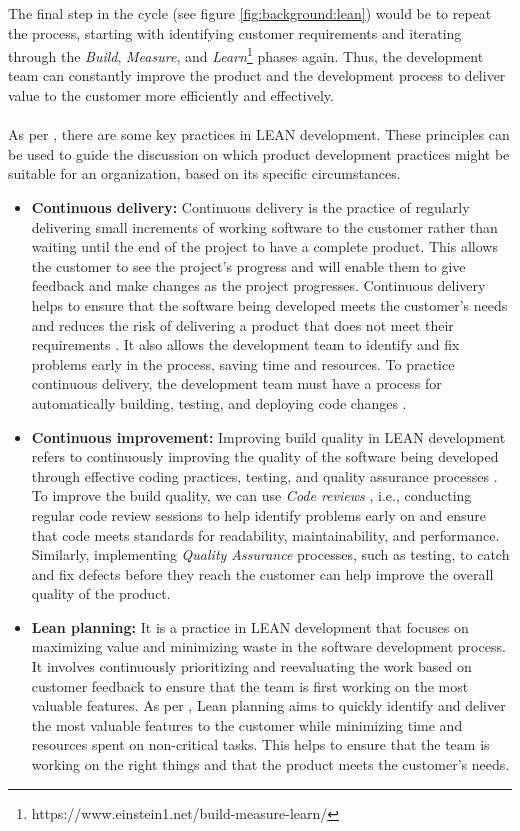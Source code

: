 The final step in the cycle (see figure \ref{fig:background:lean}) would be to repeat the process, starting with identifying customer requirements and iterating through the \textit{Build}, \textit{Measure}, and \textit{Learn}\footnote{https://www.einstein1.net/build-measure-learn/} phases again.
Thus, the development team can constantly improve the product and the development process to deliver value to the customer more efficiently and effectively. \\\\
As per \cite{misc:lean:tutorial}, there are some key practices in LEAN development.
These principles can be used to guide the discussion on which product development practices might be suitable for an organization, based on its specific circumstances.
\begin{itemize}
  \item[] \textbf{Continuous delivery:} Continuous delivery is the practice of regularly delivering small increments of working software to the customer rather than waiting until the end of the project to have a complete product. This allows the customer to see the project's progress and will enable them to give feedback and make changes as the project progresses. Continuous delivery helps to ensure that the software being developed meets the customer's needs and reduces the risk of delivering a product that does not meet their requirements \cite{article:lean:eric}. It also allows the development team to identify and fix problems early in the process, saving time and resources. To practice continuous delivery, the development team must have a process for automatically building, testing, and deploying code changes \cite{misc:lean:cicd}.
  \item[] \textbf{Continuous improvement:} Improving build quality in LEAN development refers to continuously improving the quality of the software being developed through effective coding practices, testing, and quality assurance processes \cite{misc:lean:cimp}. To improve the build quality, we can use \textit{Code reviews} \cite{misc:lean:tutorial}, i.e., conducting regular code review sessions to help identify problems early on and ensure that code meets standards for readability, maintainability, and performance. Similarly, implementing \textit{Quality Assurance} processes, such as testing, to catch and fix defects before they reach the customer can help improve the overall quality of the product.
  \item[] \textbf{Lean planning:} It is a practice in LEAN development that focuses on maximizing value and minimizing waste in the software development process. It involves continuously prioritizing and reevaluating the work based on customer feedback to ensure that the team is first working on the most valuable features. As per \cite{misc:lean:planning}, Lean planning aims to quickly identify and deliver the most valuable features to the customer while minimizing time and resources spent on non-critical tasks. This helps to ensure that the team is working on the right things and that the product meets the customer's needs. 
\end{itemize}
